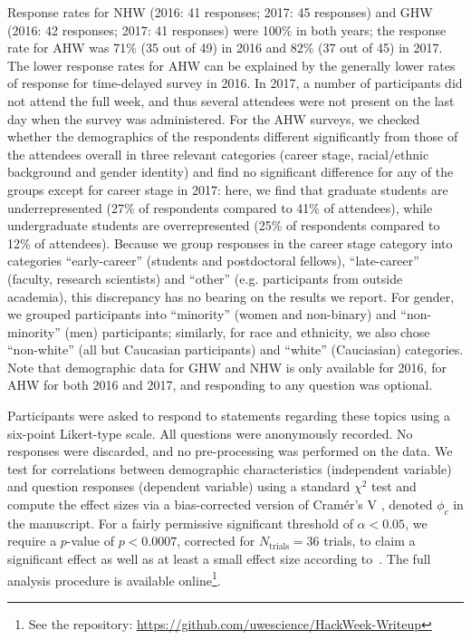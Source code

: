 \documentclass{aastex62}
\begin{document}
Response rates for NHW (2016: 41 responses; 2017: 45 responses) and GHW (2016: 42 responses; 2017: 41 responses) were 100\% in both years; the response rate for AHW was 71\% (35 out of 49) in 2016 and 82\% (37 out of 45) in 2017. The lower response rates for AHW can be explained by the generally lower rates of response for time-delayed survey in 2016. In 2017, a number of participants did not attend the full week, and thus several attendees were not present on the last day when the survey was administered. For the AHW surveys, we checked whether the demographics of the respondents different significantly from those of the attendees overall in three relevant categories (career stage, racial/ethnic background and gender identity) and find no significant difference for any of the groups except for career stage in 2017: here, we find that graduate students are underrepresented (27\% of respondents compared to 41\% of attendees), while undergraduate students are overrepresented (25\% of respondents compared to 12\% of attendees). Because we group responses in the career stage category into categories ``early-career'' (students and postdoctoral fellows), ``late-career'' (faculty, research scientists) and ``other'' (e.g. participants from outside academia), this discrepancy has no bearing on the results we report. For gender, we grouped participants into ``minority'' (women and non-binary) and ``non-minority'' (men) participants; similarly, for race and ethnicity, we also chose ``non-white'' (all but Caucasian participants) and ``white'' (Cauciasian) categories. Note that demographic data for GHW and NHW is only available for 2016, for AHW for both 2016 and 2017, and responding to any question was optional.

Participants were asked to respond to statements regarding these topics using a six-point Likert-type scale. All questions were anonymously recorded. No responses were discarded, and no pre-processing was performed on the data. We test for correlations between demographic characteristics (independent variable) and question responses (dependent variable) using a standard $\chi^2$ test and compute the effect sizes via a bias-corrected version of Cram\'{e}r's V \citep{cramer1946,bergsma2013}, denoted $\phi_c$ in the manuscript. For a fairly permissive significant threshold of $\alpha < 0.05$, we require a $p$-value of $p < 0.0007$, corrected for $N_\mathrm{trials} = 36$ trials, to claim a significant effect as well as at least a small effect size according to~\citep{cohen1988}. The full analysis procedure is available online\footnote{See the repository: \url{https://github.com/uwescience/HackWeek-Writeup}}.
\end{document}
